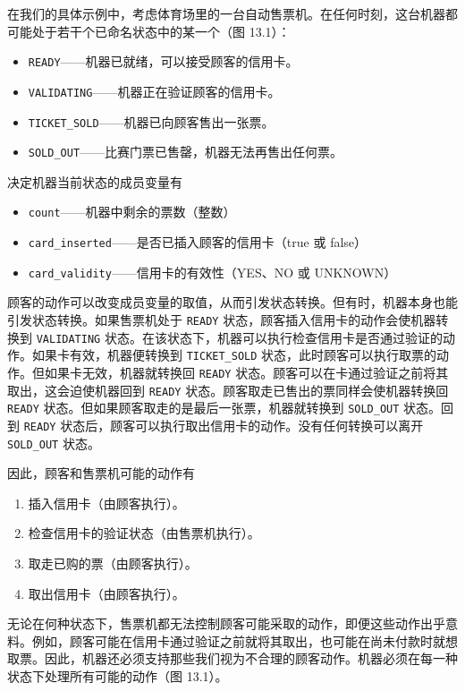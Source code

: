 在我们的具体示例中，考虑体育场里的一台自动售票机。在任何时刻，这台机器都可能处于若干个已命名状态中的某一个（图 13.1）：

\begin{itemize}
\item \texttt{READY}——机器已就绪，可以接受顾客的信用卡。
\item \texttt{VALIDATING}——机器正在验证顾客的信用卡。
\item \texttt{TICKET\_\allowbreak{}SOLD}——机器已向顾客售出一张票。
\item \texttt{SOLD\_OUT}——比赛门票已售罄，机器无法再售出任何票。
\end{itemize}

决定机器当前状态的成员变量有

\begin{itemize}
\item \texttt{count}——机器中剩余的票数（整数）
\item \texttt{card\_\allowbreak{}inserted}——是否已插入顾客的信用卡（true 或 false）
\item \texttt{card\_\allowbreak{}validity}——信用卡的有效性（YES、NO 或 UNKNOWN）
\end{itemize}

顾客的动作可以改变成员变量的取值，从而引发状态转换。但有时，机器本身也能引发状态转换。如果售票机处于 \texttt{READY} 状态，顾客插入信用卡的动作会使机器转换到 \texttt{VALIDATING} 状态。在该状态下，机器可以执行检查信用卡是否通过验证的动作。如果卡有效，机器便转换到 \texttt{TICKET\_\allowbreak{}SOLD} 状态，此时顾客可以执行取票的动作。但如果卡无效，机器就转换回 \texttt{READY} 状态。顾客可以在卡通过验证之前将其取出，这会迫使机器回到 \texttt{READY} 状态。顾客取走已售出的票同样会使机器转换回 \texttt{READY} 状态。但如果顾客取走的是最后一张票，机器就转换到 \texttt{SOLD\_OUT} 状态。回到 \texttt{READY} 状态后，顾客可以执行取出信用卡的动作。没有任何转换可以离开 \texttt{SOLD\_OUT} 状态。

因此，顾客和售票机可能的动作有

\begin{enumerate}
\item 插入信用卡（由顾客执行）。
\item 检查信用卡的验证状态（由售票机执行）。
\item 取走已购的票（由顾客执行）。
\item 取出信用卡（由顾客执行）。
\end{enumerate}

无论在何种状态下，售票机都无法控制顾客可能采取的动作，即便这些动作出乎意料。例如，顾客可能在信用卡通过验证之前就将其取出，也可能在尚未付款时就想取票。因此，机器还必须支持那些我们视为不合理的顾客动作。机器必须在每一种状态下处理所有可能的动作（图 13.1）。

